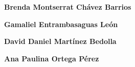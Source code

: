 \textbf{Brenda Montserrat Chávez Barrios}
\newline\newline

\textbf{Gamaliel Entrambasaguas León}
\newline\newline

\textbf{David Daniel Martínez Bedolla}
\newline\newline

\textbf{Ana Paulina Ortega Pérez}
\newline\newline




